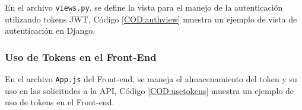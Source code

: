 
En el archivo \texttt{views.py}, se define la vista para el manejo de la autenticación utilizando tokens JWT, Código \ref{COD:authview} muestra un ejemplo de vista de autenticación en Django.

\subsubsection{Uso de Tokens en el Front-End}

En el archivo \texttt{App.js} del Front-end, se maneja el almacenamiento del token y su uso en las solicitudes a la API, Código \ref{COD:usetokens} muestra un ejemplo de uso de tokens en el Front-end.
